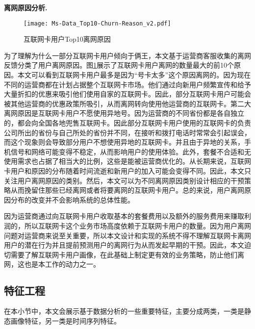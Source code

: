 \textbf{离网原因分析.}
\begin{figure}[hbt]
	\centering
	\texttt{[image: Ms-Data\_Top10-Churn-Reason\_v2.pdf]}
	\caption{互联网卡用户Top10离网原因}
	\label{Fig:Top10-Churn-Reason}
\end{figure}
为了理解为什么一部分互联网卡用户倾向于俩王，本文基于运营商客服收集的离网反馈分类了用户离网原因。图\ref{Fig:Top10-Churn-Reason}展示了互联网卡用户离网的数量最大的前10个原因。本文可以看到互联网卡用户最多是因为“号卡太多”这个原因离网的。因为现在不同的运营商都在计划占据整个互联网卡市场。他们通过向新用户频繁宣传和给予大量折扣的优惠来吸引他们使用自家的互联网卡。因此，部分互联网卡用户可能会被其他运营商的优惠政策所吸引，从而离网转向使用他运营商的互联网卡。第二大离网原因是互联网卡用户不愿使用异地号。因为运营商的不同省份都是各自独立的，都会向全国各地兜售互联网卡。因此部分互联网卡用户使用的互联网卡的负责公司所出的省份与自己所处的省份并不同，在接听和拨打电话时常常会引起误会，而这个现象则会导致部分用户不想使用异地的互联网卡。并且由于异地的关系，手机信号和网络可能变得不稳定，从而影响用户的使用体验。此外，套餐不合适和无使用需求也占据了相当大的比例，这些是能被运营商优化的。从长期来说，互联网卡用户和原因的分布随着时间流逝和新用户的加入可能会变得不同。因此，本文只关注用户离网原因的类别。然后，本文可以为不同离网原因类别设计相应的干预策略从而挽留住那些已经离网或者将要离网的互联网卡用户。总的来说，用户离网原因分布的改变并不会影响系统的总体性能。\par
因为运营商通过向互联网卡用户收取基本的套餐费用以及额外的服务费用来赚取利润的，所以互联网卡这个业务市场高度依赖于互联网卡用户的数量。因为用户离网问题对运营商来说至关重要，所以本文设计和实现的系统不得不理解互联网卡离网用户的潜在行为并且提前预测用户的离网行为从而发起早期的干预。因此，本文迫切需要了解互联网卡用户画像，在此基础上制定更有效的业务策略，防止他们离网，这也是本工作的动力之一。
\par


%
%


\subsection{特征工程}
在本小节中，本文会展示基于数据分析的一些重要特征，主要分成两类，一类是静态画像特征，另一类是时间序列特征。
